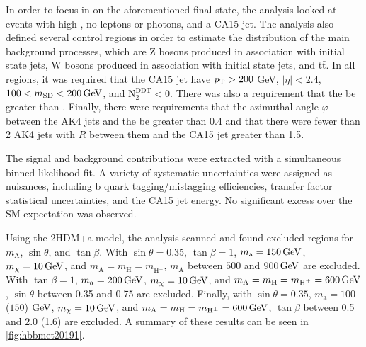 In order to focus in on the aforementioned final state, the analysis looked at events with high \ptmiss, no leptons or photons, and a CA15 jet. The analysis also defined several control regions in order to estimate the \ptmiss distribution of the main background processes, which are Z bosons produced in association with initial state jets, W bosons produced in association with initial state jets, and t$\bar{\mathrm{t}}$.
In all regions, it was required that the CA15 jet have $p_\mathrm{T} > 200$ GeV, $|\eta| <2.4$, $100<m_{\text{SD}}<\GeV{200}$, and N$_2^\text{DDT} < 0$. There was also a requirement that the \ptmiss be greater than . Finally, there were requirements that the azimuthal angle $\varphi$ between the AK4 jets and the \ptmiss be greater than 0.4 and that there were fewer than 2 AK4 jets with $R$ between them and the CA15 jet greater than 1.5.

The signal and background contributions were extracted with a simultaneous binned likelihood fit.
A variety of systematic uncertainties were assigned as nuisances, including b quark tagging/mistagging efficiencies, transfer factor statistical uncertainties, and the CA15 jet energy. No significant excess over the SM expectation was observed.

Using the 2HDM+a model, the analysis scanned and found excluded regions for $m_\mathrm{A}$, $\sin\theta$, and $\tan\beta$. With $\sin\theta=0.35$, $\tan\beta = 1$, $m_\mathrm{a}=\GeV{150}$, $m_\chi = \GeV{10}$, and $m_\mathrm{A}=m_\mathrm{H}=m_{\mathrm{H}^{\pm}}$, $m_\mathrm{A}$ between $500$ and $\GeV{900}$ are excluded. With $\tan\beta = 1$, $m_\mathrm{a}=\GeV{200}$, $m_\chi = \GeV{10}$, and $m_\mathrm{A}=m_\mathrm{H}=m_{\mathrm{H}^{\pm}} = \GeV{600}$, $\sin\theta$ between 0.35 and 0.75 are excluded. Finally, with $\sin\theta=0.35$, $m_\mathrm{a}=100$ ($150$) $\GeV{}$, $m_\chi = \GeV{10}$, and $m_\mathrm{A}=m_\mathrm{H}=m_{\mathrm{H}^{\pm}} = \GeV{600}$, $\tan\beta$ between 0.5 and 2.0 (1.6) are excluded. A summary of these results can be seen in \cref{fig:hbbmet20191}.

